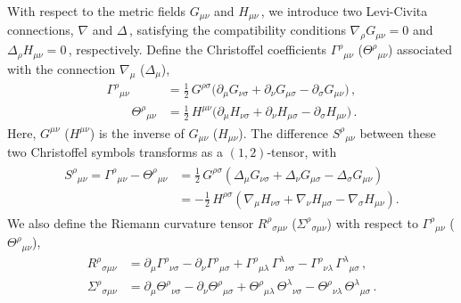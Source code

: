 \documentclass[11pt]{article}
\newcommand{\lr}{\left (}
\newcommand{\rr}{\right )}
\newcommand{\p}{\partial}
\begin{document}
With respect to the metric fields $G_{\mu\nu}$ and $H_{\mu\nu}$\,, we introduce two Levi-Civita connections, $\nabla$ and $\Delta$\,, satisfying the compatibility conditions
$\nabla_{\!\rho} G_{\mu\nu} = 0$ and $\Delta_{\rho} H_{\mu\nu} = 0$\,, respectively.
%
Define the Christoffel coefficients $\Gamma^\rho{}_{\mu\nu}$ ($\Theta^\rho{}_{\mu\nu}$) associated with the connection $\nabla_{\!\mu}$ ($\Delta_\mu$),
%
\begin{subequations}
\begin{align}
	\Gamma^\rho{}_{\mu\nu} & = \frac{1}{2} \, G^{\rho\sigma} \bigl( \p_\mu G_{\nu\sigma} + \p_\nu G_{\mu\sigma} - \p_\sigma G_{\mu\nu} \bigr)\,, \\[2pt]
		\qquad%
	\Theta^\rho{}_{\mu\nu} & = \frac{1}{2} \, H^{\mu\nu} \bigl( \p_\mu H_{\nu\sigma} + \p_\nu H_{\mu\sigma} - \p_\sigma H_{\mu\nu} \bigr)\,. \label{eq:ThetaH}
\end{align}
\end{subequations}
%
Here, $G^{\mu\nu}$ ($H^{\mu\nu}$) is the inverse of $G_{\mu\nu}$ ($H_{\mu\nu}$).
The difference $S^\rho{}_{\mu\nu}$ between these two Christoffel symbols transforms as a $(1,2)$-tensor, with
%
\begin{align} \label{eq:defS}
\begin{split}
	S^\rho{}_{\mu\nu} = \Gamma^\rho{}_{\mu\nu} - \Theta^\rho{}_{\mu\nu} 
		& = \frac{1}{2} \, G^{\rho\sigma} \lr \Delta_\mu G_{\nu\sigma} + \Delta_\nu G_{\mu\sigma} - \Delta_\sigma G_{\mu\nu} \rr \\[2pt]
		& = - \frac{1}{2} \, H^{\rho\sigma} \lr \nabla_{\!\mu} H_{\nu\sigma} + \nabla_{\!\nu} H_{\mu\sigma} - \nabla_{\!\sigma} H_{\mu\nu} \rr.
\end{split}
\end{align}
%
We also define the Riemann curvature tensor $R^\rho{}_{\sigma\mu\nu}$ ($\Sigma^\rho{}_{\sigma\mu\nu}$) with respect to $\Gamma^\rho{}_{\mu\nu}$ ($\Theta^\rho{}_{\mu\nu}$), 
%
\begin{subequations}
\begin{align}
	R^\rho{}_{\sigma\mu\nu} & = \p_\mu \Gamma^\rho{}_{\nu\sigma} - \p_\nu \Gamma^\rho{}_{\mu\sigma} + \Gamma^\rho{}_{\mu\lambda} \, \Gamma^\lambda{}_{\nu\sigma} - \Gamma^\rho{}_{\nu\lambda} \, \Gamma^\lambda{}_{\mu\sigma}\,, \\[2pt]
	\Sigma^\rho{}_{\sigma\mu\nu} & = \p_\mu \Theta^\rho{}_{\nu\sigma} - \p_\nu \Theta^\rho{}_{\mu\sigma} + \Theta^\rho{}_{\mu\lambda} \, \Theta^\lambda{}_{\nu\sigma} - \Theta^\rho{}_{\nu\lambda} \, \Theta^\lambda{}_{\mu\sigma}\,.
\end{align}
\end{subequations}
\end{document}
